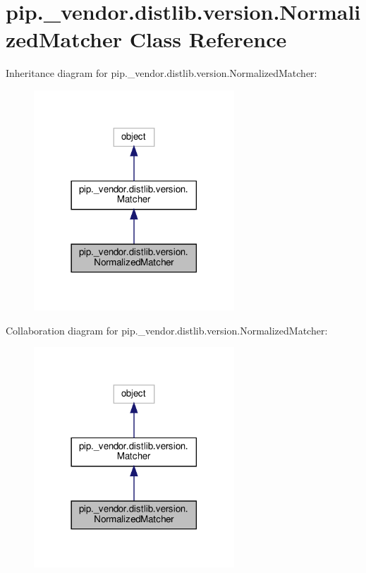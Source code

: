 \hypertarget{classpip_1_1__vendor_1_1distlib_1_1version_1_1NormalizedMatcher}{}\section{pip.\+\_\+vendor.\+distlib.\+version.\+Normalized\+Matcher Class Reference}
\label{classpip_1_1__vendor_1_1distlib_1_1version_1_1NormalizedMatcher}


Inheritance diagram for pip.\+\_\+vendor.\+distlib.\+version.\+Normalized\+Matcher\+:
\nopagebreak
\begin{figure}[H]
\begin{center}
\leavevmode
\includegraphics[width=213pt]{classpip_1_1__vendor_1_1distlib_1_1version_1_1NormalizedMatcher__inherit__graph}
\end{center}
\end{figure}


Collaboration diagram for pip.\+\_\+vendor.\+distlib.\+version.\+Normalized\+Matcher\+:
\nopagebreak
\begin{figure}[H]
\begin{center}
\leavevmode
\includegraphics[width=213pt]{classpip_1_1__vendor_1_1distlib_1_1version_1_1NormalizedMatcher__coll__graph}
\end{center}
\end{figure}

